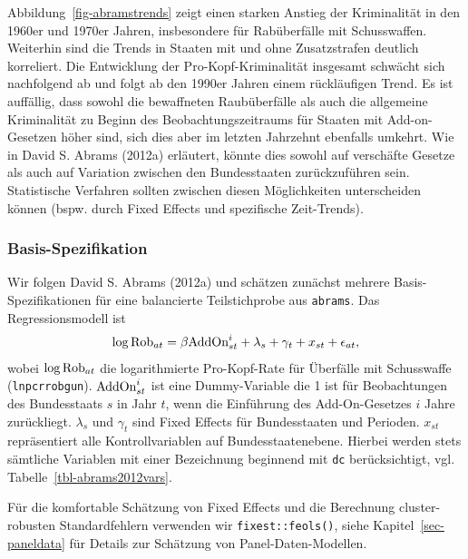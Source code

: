 \documentclass[
  a4paper,
  DIV=11,
  oneside]{scrreprt}
\begin{document}
Abbildung~\ref{fig-abramstrends} zeigt einen starken Anstieg der
Kriminalität in den 1960er und 1970er Jahren, insbesondere für
Rabüberfälle mit Schusswaffen. Weiterhin sind die Trends in Staaten mit
und ohne Zusatzstrafen deutlich korreliert. Die Entwicklung der
Pro-Kopf-Kriminalität insgesamt schwächt sich nachfolgend ab und folgt
ab den 1990er Jahren einem rückläufigen Trend. Es ist auffällig, dass
sowohl die bewaffneten Raubüberfälle als auch die allgemeine
Kriminalität zu Beginn des Beobachtungszeitraums für Staaten mit
Add-on-Gesetzen höher sind, sich dies aber im letzten Jahrzehnt
ebenfalls umkehrt. Wie in David S. Abrams (2012a) erläutert, könnte dies
sowohl auf verschäfte Gesetze als auch auf Variation zwischen den
Bundesstaaten zurückzuführen sein. Statistische Verfahren sollten
zwischen diesen Möglichkeiten unterscheiden können (bspw. durch Fixed
Effects und spezifische Zeit-Trends).

\subsubsection{Basis-Spezifikation}\label{basis-spezifikation}

Wir folgen David S. Abrams (2012a) und schätzen zunächst mehrere
Basis-Spezifikationen für eine balancierte Teilstichprobe aus
\texttt{abrams}. Das Regressionsmodell ist \begin{align}
  \log\textup{Rob}_{at} = \beta \textup{AddOn}^i_{st} + \lambda_s + \gamma_t + x_{st} + \epsilon_{at},
\end{align} wobei \(\log\textup{Rob}_{at}\) die logarithmierte
Pro-Kopf-Rate für Überfälle mit Schusswaffe (\texttt{lnpcrrobgun}).
\(\textup{AddOn}^i_{st}\) ist eine Dummy-Variable die 1 ist für
Beobachtungen des Bundesstaats \(s\) in Jahr \(t\), wenn die Einführung
des Add-On-Gesetzes \(i\) Jahre zurückliegt. \(\lambda_s\) und
\(\gamma_t\) sind Fixed Effects für Bundesstaaten und Perioden.
\(x_{st}\) repräsentiert alle Kontrollvariablen auf Bundesstaatenebene.
Hierbei werden stets sämtliche Variablen mit einer Bezeichnung beginnend
mit \texttt{dc} berücksichtigt, vgl. Tabelle~\ref{tbl-abrams2012vars}.

Für die komfortable Schätzung von Fixed Effects und die Berechnung
cluster-robusten Standardfehlern verwenden wir \texttt{fixest::feols()},
siehe Kapitel~\ref{sec-paneldata} für Details zur Schätzung von
Panel-Daten-Modellen.
\end{document}
